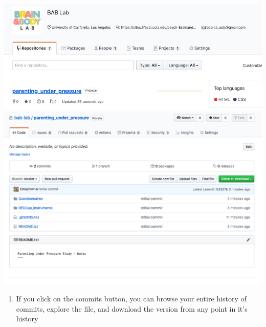 \documentclass[]{book}
\providecommand{\tightlist}{%
  \setlength{\itemsep}{0pt}\setlength{\parskip}{0pt}}
\begin{document}
\includegraphics{images/research_protocols/github/13.png}
\includegraphics{images/research_protocols/github/14.png}

\begin{enumerate}
\def\labelenumi{\arabic{enumi}.}
\setcounter{enumi}{9}
\tightlist
\item
  If you click on the commits button, you can browse your entire history of commits, explore the file, and download the version from any point in it's history
\end{enumerate}
\end{document}
